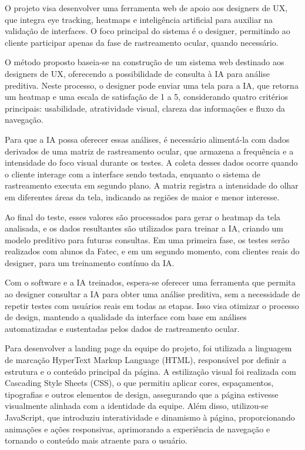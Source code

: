 O projeto visa desenvolver uma ferramenta web de apoio aos designers de UX, que integra eye tracking, heatmaps e inteligência artificial para auxiliar na validação de interfaces. O foco principal do sistema é o designer, permitindo ao cliente participar apenas da fase de rastreamento ocular, quando necessário.

O método proposto baseia-se na construção de um sistema web destinado aos designers de UX, oferecendo a possibilidade de consulta à IA para análise preditiva. Neste processo, o designer pode enviar uma tela para a IA, que retorna um heatmap e uma escala de satisfação de 1 a 5, considerando quatro critérios principais: usabilidade, atratividade visual, clareza das informações e fluxo da navegação.

Para que a IA possa oferecer essas análises, é necessário alimentá-la com dados derivados de uma matriz de rastreamento ocular, que armazena a frequência e a intensidade do foco visual durante os testes. A coleta desses dados ocorre quando o cliente interage com a interface sendo testada, enquanto o sistema de rastreamento executa em segundo plano. A matriz registra a intensidade do olhar em diferentes áreas da tela, indicando as regiões de maior e menor interesse.

Ao final do teste, esses valores são processados para gerar o heatmap da tela analisada, e os dados resultantes são utilizados para treinar a IA, criando um modelo preditivo para futuras consultas. Em uma primeira fase, os testes serão realizados com alunos da Fatec, e em um segundo momento, com clientes reais do designer, para um treinamento contínuo da IA.

Com o software e a IA treinados, espera-se oferecer uma ferramenta que permita ao designer consultar a IA para obter uma análise preditiva, sem a necessidade de repetir testes com usuários reais em todas as etapas. Isso visa otimizar o processo de design, mantendo a qualidade da interface com base em análises automatizadas e sustentadas pelos dados de rastreamento ocular.

Para desenvolver a landing page da equipe do projeto, foi utilizada a linguagem de marcação HyperText Markup Language (HTML), responsável por definir a estrutura e o conteúdo principal da página. A estilização visual foi realizada com Cascading Style Sheets (CSS), o que permitiu aplicar cores, espaçamentos, tipografias e outros elementos de design, assegurando que a página estivesse visualmente alinhada com a identidade da equipe. Além disso, utilizou-se JavaScript, que introduziu interatividade e dinamismo à página, proporcionando animações e ações responsivas, aprimorando a experiência de navegação e tornando o conteúdo mais atraente para o usuário.

